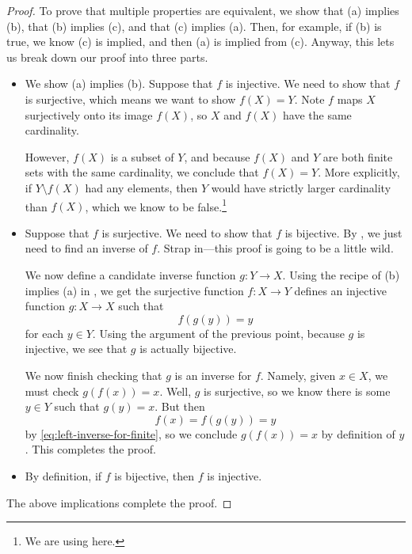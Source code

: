 \documentclass[../notes.tex]{subfiles}
\begin{document}
\begin{proof}
    To prove that multiple properties are equivalent, we show that (a) implies (b), that (b) implies (c), and that (c) implies (a). Then, for example, if (b) is true, we know (c) is implied, and then (a) is implied from (c). Anyway, this lets us break down our proof into three parts.
    \begin{itemize}
        \item We show (a) implies (b). Suppose that $f$ is injective. We need to show that $f$ is surjective, which means we want to show $f(X)=Y$. Note $f$ maps $X$ surjectively onto its image $f(X)$, so $X$ and $f(X)$ have the same cardinality.

        However, $f(X)$ is a subset of $Y$, and because $f(X)$ and $Y$ are both finite sets with the same cardinality, we conclude that $f(X)=Y$. More explicitly, if $Y\setminus f(X)$ had any elements, then $Y$ would have strictly larger cardinality than $f(X)$, which we know to be false.\footnote{We are using  here.}
        
        \item Suppose that $f$ is surjective. We need to show that $f$ is bijective. By , we just need to find an inverse of $f$. Strap in---this proof is going to be a little wild.
        
        We now define a candidate inverse function $g\colon Y \to X$. Using the recipe of (b) implies (a) in , we get the surjective function $f\colon X\to Y$ defines an injective function $g\colon X\to X$ such that
        \begin{equation}
            f(g(y))=y \label{eq:left-inverse-for-finite}
        \end{equation}
        for each $y\in Y$. Using the argument of the previous point, because $g$ is injective, we see that $g$ is actually bijective.

        We now finish checking that $g$ is an inverse for $f$. Namely, given $x\in X$, we must check $g(f(x))=x$. Well, $g$ is surjective, so we know there is some $y\in Y$ such that $g(y)=x$. But then
        \[f(x)=f(g(y))=y\]
        by \autoref{eq:left-inverse-for-finite}, so we conclude $g(f(x))=x$ by definition of $y$. This completes the proof.
        \item By definition, if $f$ is bijective, then $f$ is injective.
    \end{itemize}
    The above implications complete the proof.
\end{proof}
\end{document}
